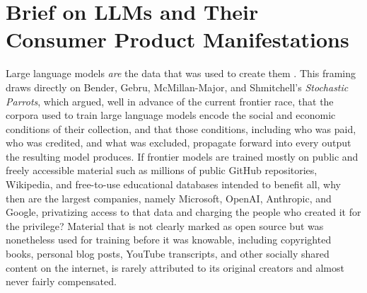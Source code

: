 \documentclass[10pt,a4paper,twocolumn]{article}
\begin{document}
\twocolumn
\newpage
{}
\setcounter{page}{1}

\section{Brief on LLMs and Their Consumer Product Manifestations}
\label{sec:premise}

Large language models \emph{are} the data that was used to create them \citep{bender2021parrots}. This framing draws directly on Bender, Gebru, McMillan-Major, and Shmitchell's \emph{Stochastic Parrots}, which argued, well in advance of the current frontier race, that the corpora used to train large language models encode the social and economic conditions of their collection, and that those conditions, including who was paid, who was credited, and what was excluded, propagate forward into every output the resulting model produces. If frontier models are trained mostly on public and freely accessible material such as millions of public GitHub repositories, Wikipedia, and free-to-use educational databases intended to benefit all, why then are the largest companies, namely Microsoft, OpenAI, Anthropic, and Google, privatizing access to that data and charging the people who created it for the privilege? Material that is not clearly marked as open source but was nonetheless used for training before it was knowable, including copyrighted books, personal blog posts, YouTube transcripts, and other socially shared content on the internet, is rarely attributed to its original creators and almost never fairly compensated.
\end{document}
